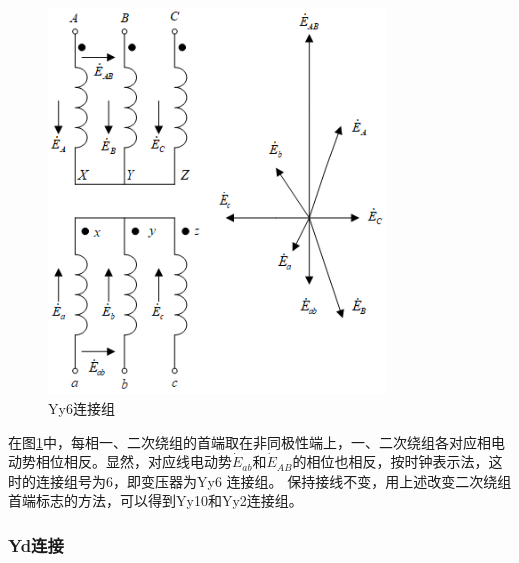 \documentclass{book}
\begin{document}
\begin{figure}[H]
	\centering
	\includegraphics[width=0.80\textwidth]{4-7g.png}
	\caption{Yy6连接组}
	\label{fig_4.7}
\end{figure}
在图\ref{fig_4.7}中，每相一、二次绕组的首端取在非同极性端上，一、二次绕组各对应相电动势相位相反。显然，对应线电动势${{\dot{E}}_{ab}}$和${{\dot{E}}_{AB}}$的相位也相反，按时钟表示法，这时的连接组号为6，即变压器为Yy6 连接组。
保持接线不变，用上述改变二次绕组首端标志的方法，可以得到Yy10和Yy2连接组。

\subsubsection{Yd连接}
\end{document}
